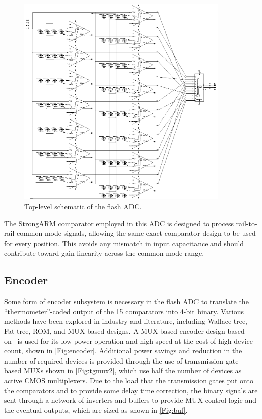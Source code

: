 \documentclass[11pt,letterpaper]{article}
\begin{document}
 \begin{figure}[htbp!]
		\centering
		\includegraphics[width=4in]{flash_old.eps}
		\caption{Top-level schematic of the flash ADC.}\label{Fig:flash}
	\end{figure}

The StrongARM comparator employed in this ADC is designed to process rail-to-rail common mode signals, allowing the same exact comparator design to be used for every position. This avoids any mismatch in input capacitance and should contribute toward gain linearity across the common mode range.

\subsection{Encoder}

Some form of encoder subsystem is necessary in the flash ADC to translate the ``thermometer''-coded output of the 15 comparators into 4-bit binary. Various methods have been explored in industry and literature, including Wallace tree, Fat-tree, ROM, and MUX based designs. A MUX-based encoder design based on~\cite{Lee2013} is used for its low-power operation and high speed at the cost of high device count, shown in \cref{Fig:encoder}. Additional power savings and reduction in the number of required devices is provided through the use of transmission gate-based MUXs shown in \cref{Fig:tgmux2}, which use half the number of devices as active CMOS multiplexers. Due to the load that the transmission gates put onto the comparators and to provide some delay time correction, the binary signals are sent through a network of inverters and buffers to provide MUX control logic and the eventual outputs, which are sized as shown in \cref{Fig:buf}.
\end{document}
